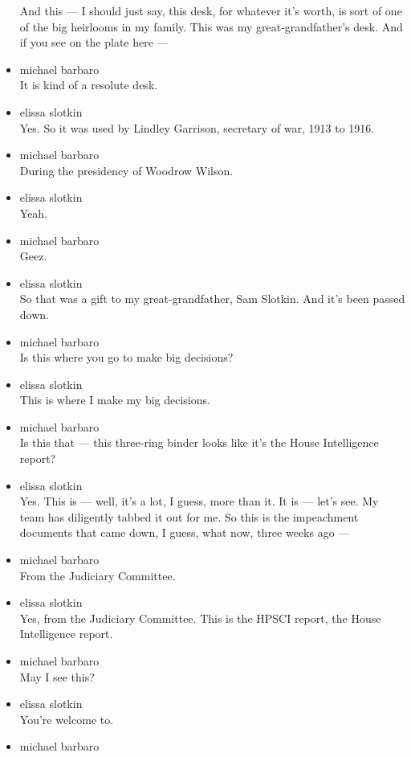 \begin{itemize}
  And this --- I should just say, this desk, for whatever it's worth, is
  sort of one of the big heirlooms in my family. This was my
  great-grandfather's desk. And if you see on the plate here ---
\item
  michael barbaro\\
  It is kind of a resolute desk.
\item
  elissa slotkin\\
  Yes. So it was used by Lindley Garrison, secretary of war, 1913 to
  1916.
\item
  michael barbaro\\
  During the presidency of Woodrow Wilson.
\item
  elissa slotkin\\
  Yeah.
\item
  michael barbaro\\
  Geez.
\item
  elissa slotkin\\
  So that was a gift to my great-grandfather, Sam Slotkin. And it's been
  passed down.
\item
  michael barbaro\\
  Is this where you go to make big decisions?
\item
  elissa slotkin\\
  This is where I make my big decisions.
\item
  michael barbaro\\
  Is this that --- this three-ring binder looks like it's the House
  Intelligence report?
\item
  elissa slotkin\\
  Yes. This is --- well, it's a lot, I guess, more than it. It is ---
  let's see. My team has diligently tabbed it out for me. So this is the
  impeachment documents that came down, I guess, what now, three weeks
  ago ---
\item
  michael barbaro\\
  From the Judiciary Committee.
\item
  elissa slotkin\\
  Yes, from the Judiciary Committee. This is the HPSCI report, the House
  Intelligence report.
\item
  michael barbaro\\
  May I see this?
\item
  elissa slotkin\\
  You're welcome to.
\item
  michael barbaro\\

\end{itemize}
